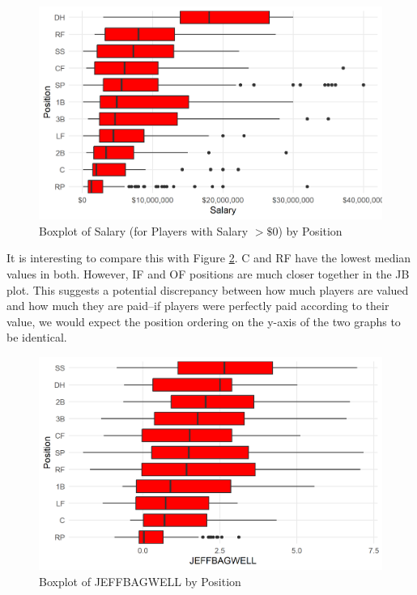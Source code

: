 \documentclass{article}
\begin{document}
\begin{figure}[H]
\caption{Boxplot of Salary (for Players with Salary $> \$0$) by Position}
\label{fig:salary_position_boxplot}
\centering
\includegraphics[width=0.7\paperwidth, scale=1.25]{salary_position_boxplots.png}
\end{figure}

It is interesting to compare this with Figure \ref{fig:war_position_boxplot}. C and RF have the lowest median values in both. However, IF and OF positions are much closer together in the JB plot. This suggests a potential discrepancy between how much players are valued and how much they are paid--if players were perfectly paid according to their value, we would expect the position ordering on the y-axis of the two graphs to be identical.  

\begin{figure}[H]
\caption{Boxplot of JEFFBAGWELL by Position}
\label{fig:war_position_boxplot}
\centering
\includegraphics[width=0.7\paperwidth, scale=1.25]{war_position_boxplots.png}
\end{figure}
\end{document}
